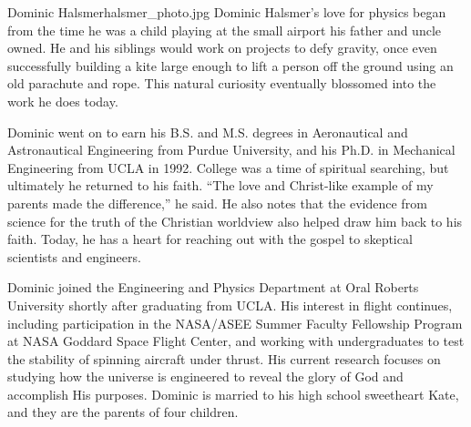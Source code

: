 \begin{authorbio}{Dominic Halsmer}{halsmer_photo.jpg}
Dominic Halsmer's love for physics began from the time he was a child playing at the small airport his father and uncle owned.  He and his siblings would work on projects to defy gravity, once even successfully building a kite large enough to lift a person off the ground using an old parachute and rope.  This natural curiosity eventually blossomed into the work he does today.  

Dominic went on to earn his B.S. and M.S. degrees in Aeronautical and Astronautical Engineering from Purdue University, and his Ph.D. in Mechanical Engineering from UCLA in 1992.  College was a time of spiritual searching, but ultimately he returned to his faith.  ``The love and Christ-like example of my parents made the difference,'' he said.  He also notes that the evidence from science for the truth of the Christian worldview also helped draw him back to his faith.  Today, he has a heart for reaching out with the gospel to skeptical scientists and engineers.

Dominic joined the Engineering and Physics Department at Oral Roberts University shortly after graduating from UCLA.  His interest in flight continues, including participation in the NASA/ASEE Summer Faculty Fellowship Program at NASA Goddard Space Flight Center, and working with undergraduates to test the stability of spinning aircraft under thrust.  His current research focuses on studying how the universe is engineered to reveal the glory of God and accomplish His purposes.  Dominic is married to his high school sweetheart Kate, and they are the parents of four children.


\end{authorbio}
